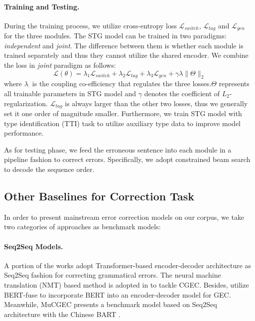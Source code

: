 \documentclass[11pt]{article}
\begin{document}
\paragraph{Training and Testing.} During the training process, we utilize cross-entropy loss $\mathcal{L}_{switch}$, $\mathcal{L}_{tag}$ and $\mathcal{L}_{gen}$ for the three modules. The STG model can be trained in two paradigms: \emph{independent} and \emph{joint}. The difference between them is whether each module is trained separately and thus they cannot utilize the shared encoder. We combine the loss in \emph{joint} paradigm as follows:
\begin{equation}
    \mathcal{L}(\theta) = \lambda_1 \mathcal{L}_{switch} + \lambda_2 \mathcal{L}_{tag} + \lambda_3 \mathcal{L}_{gen} + \gamma \lambda\|\Theta\|_{2}
    \label{eq:4}
\end{equation}
where $\lambda_\cdot$ is the coupling co-efficiency that regulates the three losses.$\Theta$ represents all trainable parameters in STG model and $\gamma$ denotes the coefficient of $L_2$-regularization. $\mathcal{L}_{tag}$ is always larger than the other two losses, thus we generally set it one order of magnitude smaller. Furthermore, we train STG model with type identification (TTI) task to utilize auxiliary type data to improve model performance.

As for testing phase, we feed the erroneous sentence into each module in a pipeline fashion to correct errors. Specifically, we adopt constrained beam search to decode the sequence order.

\subsection{Other Baselines for Correction Task}
\label{sec:benchmrk-gec}

In order to present mainstream error correction models on our corpus, we take two categories of approaches as benchmark models:

\paragraph{Seq2Seq Models.} A portion of the works adopt Transformer-based \cite{vaswani2017attention} encoder-decoder architecture as Seq2Seq fashion for correcting grammatical errors. The neural machine translation (NMT) based method is adopted in \citet{fu2018youdao} to tackle CGEC. Besides, \citet{kaneko2020encoder} utilize BERT-fuse to incorporate BERT into an encoder-decoder model for GEC. Meanwhile, MuCGEC \cite{zhang2022mucgec} presents a benchmark model based on Seq2Seq architecture with the Chinese BART \cite{shao2021cpt}.
\end{document}
